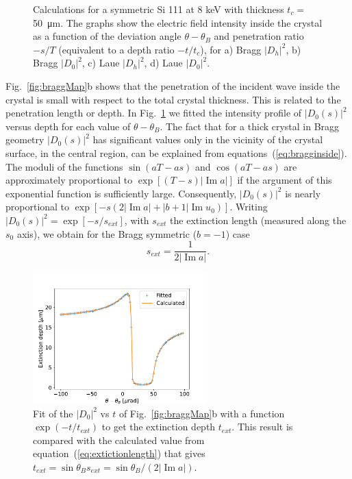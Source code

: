 \documentclass{iucr}
\begin{document}
\begin{figure}
    \caption{Calculations for a symmetric Si 111 at 8 keV with thickness $t_c=$\SI{50}{\micro\meter}. The graphs show the electric field intensity inside the crystal as a function of the 
    deviation angle $\theta-\theta_B$ and penetration ratio $-s/T$ (equivalent to a depth ratio $-t/t_c$), for
    a) Bragg $|D_h|^2$, b) Bragg $|D_0|^2$,
    c) Laue $|D_h|^2$, d) Laue $|D_0|^2$.
    }
\end{figure}

Fig.~\ref{fig:braggMap}b shows that the penetration of the incident wave inside the crystal is small with respect to the total crystal thickness. This is related to the penetration length or depth. In Fig.~\ref{fig:penetration} we fitted the intensity profile of $|D_0(s)|^2$ versus depth for each value of $\theta-\theta_B$.
The fact that for a thick crystal in Bragg geometry $|D_0(s)|^2$ has significant values only in the vicinity of the crystal surface, in the central region, can be explained from equations~(\ref{eq:bragginside}). The moduli of the functions $\sin(aT-as)$ and $\cos(aT-as)$ are approximately proportional to $\exp[(T-s)|\operatorname{Im}a|]$ if the argument of this exponential function is sufficiently large. Consequently, $|D_0(s)|^2$ is nearly proportional to $\exp[-s(2|\operatorname{Im}a|+|b+1|\operatorname{Im}u_0)]$. Writing $|D_0(s)|^2=\exp[-s/s_{ext}]$, with $s_{ext}$ the extinction length (measured along the $s_0$ axis), we obtain for the Bragg symmetric ($b=-1$) case  
\begin{equation}\label{eq:extictionlength}
    s_{ext} = \frac{1}{2 |\operatorname{Im}a|}.
\end{equation}

\begin{figure}\label{fig:penetration}
    \centering
    \includegraphics[width=0.6\textwidth]{figures/penetration.pdf}

    \caption{Fit of the $|D_0|^2$ vs $t$ of Fig.~\ref{fig:braggMap}b with a function $\exp(-t/t_{ext})$ to get the extinction depth $t_{ext}$. This result is compared with the calculated value from equation~(\ref{eq:extictionlength}) that gives $t_{ext}=\sin\theta_B s_{ext} = \sin\theta_B/(2 |\operatorname{Im} a|)$.
    }
\end{figure}
\end{document}
